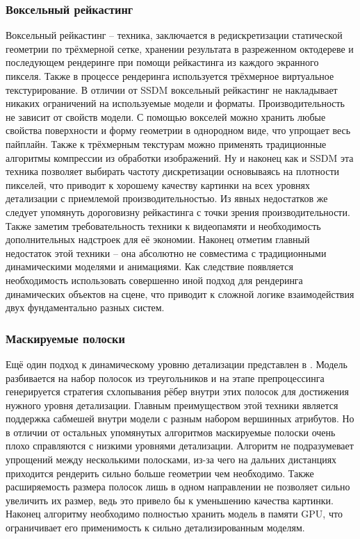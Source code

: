 \subsubsection{Воксельный рейкастинг}
Воксельный рейкастинг \cite{cur_and_next_parallelism} -- техника, заключается в редискретизации статической геометрии по трёхмерной сетке, хранении результата в разреженном октодереве и последующем рендеринге при помощи рейкастинга из каждого экранного пикселя. Также в процессе рендеринга используется трёхмерное виртуальное текстурирование. В отличии от SSDM воксельный рейкастинг не накладывает никаких ограничений на используемые модели и форматы. Производительность не зависит от свойств модели. С помощью вокселей можно хранить любые свойства поверхности и форму геометрии в однородном виде, что упрощает весь пайплайн. Также к трёхмерным текстурам можно применять традиционные алгоритмы компрессии из обработки изображений. Ну и наконец как и SSDM эта техника позволяет выбирать частоту дискретизации основываясь на плотности пикселей, что приводит к хорошему качеству картинки на всех уровнях детализации с приемлемой производительностью. Из явных недостатков же следует упомянуть дороговизну рейкастинга с точки зрения производительности. Также заметим требовательность техники к видеопамяти и необходимость дополнительных надстроек для её экономии. Наконец отметим главный недостаток этой техники -- она абсолютно не совместима с традиционными динамическими моделями и анимациями. Как следствие появляется необходимость использовать совершенно иной подход для рендеринга динамических объектов на сцене, что приводит к сложной логике взаимодействия двух фундаментально разных систем.

\subsubsection{Маскируемые полоски}
Ещё один подход к динамическому уровню детализации представлен в \cite{RIPOLLES2009184}. Модель разбивается на набор полосок из треугольников и на этапе препроцессинга генерируется стратегия схлопывания рёбер внутри этих полосок для достижения нужного уровня детализации. Главным преимуществом этой техники является поддержка сабмешей внутри модели с разным набором вершинных атрибутов. Но в отличии от остальных упомянутых алгоритмов маскируемые полоски очень плохо справляются с низкими уровнями детализации. Алгоритм не подразумевает упрощений между несколькими полосками, из-за чего на дальних дистанциях приходится рендерить сильно больше геометрии чем необходимо. Также расширяемость размера полосок лишь в одном направлении не позволяет сильно увеличить их размер, ведь это привело бы к уменьшению качества картинки. Наконец алгоритму необходимо полностью хранить модель в памяти GPU, что ограничивает его применимость к сильно детализированным моделям.

